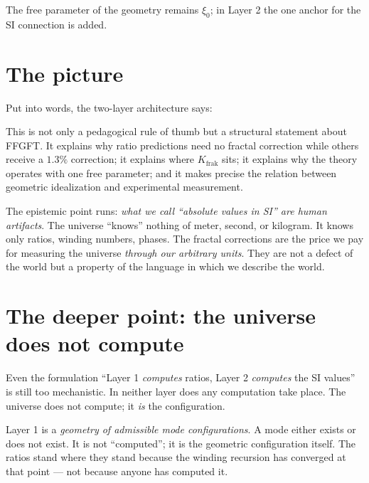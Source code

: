 The free parameter of the geometry remains $\xi_{0}$; in Layer 2 the
one anchor for the SI connection is added.

\section{The picture}

Put into words, the two-layer architecture says:

\begin{center}
\end{center}

This is not only a pedagogical rule of thumb but a structural statement
about FFGFT. It explains why ratio predictions need no fractal correction
while others receive a $1{.}3\%$ correction; it explains where
$K_{\mathrm{frak}}$ sits; it explains why the theory operates with one
free parameter; and it makes precise the relation between geometric
idealization and experimental measurement.

The epistemic point runs: \emph{what we call ``absolute values in
SI'' are human artifacts}. The universe ``knows'' nothing of meter,
second, or kilogram. It knows only ratios, winding numbers, phases.
The fractal corrections are the price we pay for measuring the
universe \emph{through our arbitrary units}. They are not a defect of
the world but a property of the language in which we describe the
world.

\section{The deeper point: the universe does not compute}

Even the formulation ``Layer 1 \emph{computes} ratios, Layer 2
\emph{computes} the SI values'' is still too mechanistic. In neither
layer does any computation take place. The universe does not compute;
it \emph{is} the configuration.

Layer 1 is a \emph{geometry of admissible mode configurations}. A
mode either exists or does not exist. It is not ``computed''; it is
the geometric configuration itself. The ratios stand where they stand
because the winding recursion has converged at that point --- not
because anyone has computed it.

